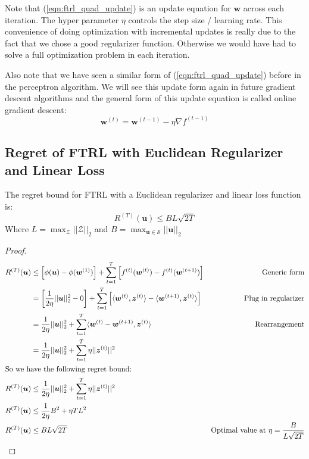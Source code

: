 \documentclass[11pt]{article}
\begin{document}
Note that (\ref{eqn:ftrl_quad_update}) is an update equation for $\bm{w}$ across each iteration. The hyper parameter $\eta$ controls the step size / learning rate. This convenience of doing optimization with incremental updates is really due to the fact that we chose a good regularizer function. Otherwise we would have had to solve a full optimization problem in each iteration.

Also note that we have seen a similar form of (\ref{eqn:ftrl_quad_update}) before in the perceptron algorithm. We will see this update form again in future gradient descent algorithms and the general form of this update equation is called online gradient descent:
\begin{equation}
    \label{eqn:ftrl_update_general}
    \bm{w}^{(t)} = \bm{w}^{(t-1)} - \eta \nabla f^{(t-1)}
\end{equation}

\subsection{Regret of FTRL with Euclidean Regularizer and Linear Loss}

The regret bound for FTRL with a Euclidean regularizer and linear loss function is:
\begin{equation}
    \label{eqn:ftrl_regret_bound_euclidean}
    R^{(T)}(\bm{u}) \leq BL\sqrt{2T}
\end{equation}
Where $L = \max_\mathcal{Z} || \mathcal{Z} ||_2$ and $B = \max_{\bm{u} \in \mathcal{S}} || \bm{u} ||_2$

\begin{proof}
\begin{align}
    \notag
    R^{(T)}(\bm{u}) &\leq \left[ \phi(\bm{u}) - \phi(\bm{w}^{(1)}) \right] +
    \sum_{t=1}^T \left[  f^{(t)} (\bm{w}^{(t)}) - f^{(t)}(\bm{w}^{(t+1)}) \right]
    & \text{Generic form}\\
    \notag
    &= \left[  \frac{1}{2\eta}||\bm{u}||^2_2 - 0 \right] +
    \sum_{t=1}^T \left[ \langle \bm{w}^{(t)}, \bm{z}^{(t)} \rangle - \langle \bm{w}^{(t+1)}, \bm{z}^{(t)}\rangle \right]
    & \text{Plug in regularizer}\\
    \notag
    &= \frac{1}{2\eta}||\bm{u}||^2_2 + \sum_{t=1}^T \langle \bm{w}^{(t)} - \bm{w}^{(t+1)}, \bm{z}^{(t)} \rangle
    & \text{Rearrangement} \\
    \notag
    &= \frac{1}{2\eta}||\bm{u}||^2_2 + \sum_{t=1}^T \eta || \bm{z}^{(t)} ||^2\\
    \intertext{So we have the following regret bound:}
    \notag
    R^{(T)}(\bm{u}) &\leq \frac{1}{2\eta}||\bm{u}||^2_2 +
    \sum_{t=1}^T \eta || \bm{z}^{(t)} ||^2\\
    \notag
    R^{(T)}(\bm{u}) &\leq \frac{1}{2\eta}B^2 + \eta T L^2\\
    \notag
    R^{(T)}(\bm{u}) &\leq BL \sqrt{2T}
    & \text{Optimal value at $\eta = \frac{B}{L \sqrt{2T}}$}
\end{align}
\end{proof}
\end{document}
